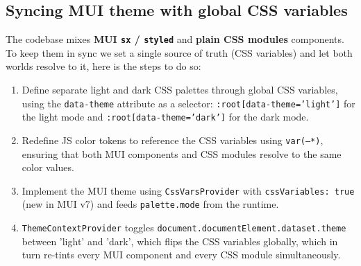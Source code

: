 \subsection{Syncing MUI theme with global CSS variables}

The codebase mixes \textbf{MUI \lstinline|sx| / \lstinline|styled|} and \textbf{plain CSS modules} components. To keep them in sync we set a single source of truth (CSS variables) and let both worlds resolve to it, here is the steps to do so:

\begin{enumerate}
    \item Define separate light and dark CSS palettes through global CSS variables, using the \texttt{data-theme} attribute as a selector: \texttt{:root[data-theme='light']} for the light mode and \texttt{:root[data-theme='dark']} for the dark mode.
    \item Redefine JS color tokens to reference the CSS variables using \texttt{var(--*)}, ensuring that both MUI components and CSS modules resolve to the same color values.
    \item Implement the MUI theme using \texttt{CssVarsProvider} with \texttt{cssVariables: true} (new in MUI v7) and feeds \texttt{palette.mode} from the runtime.
    \item \texttt{ThemeContextProvider} toggles \texttt{document.documentElement.dataset.theme} between 'light' and 'dark', which flips the CSS variables globally, which in turn re-tints every MUI component and every CSS module simultaneously.
\end{enumerate}

